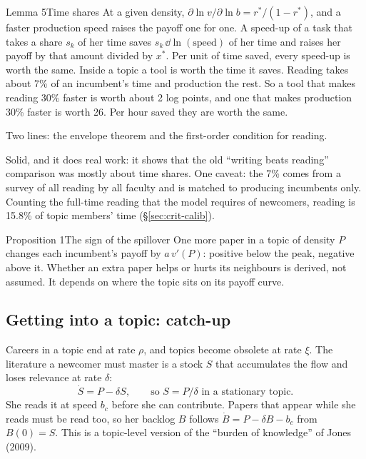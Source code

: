 \begin{resultbox}{Lemma 5}{Time shares}{\tsolid}
At a given density, $\partial\ln v/\partial\ln b=r^*/(1-r^*)$, and a faster production speed raises the payoff one for one. A speed-up of a task that takes a share $s_k$ of her time saves $s_k\,\dd\ln(\text{speed})$ of her time and raises her payoff by that amount divided by $x^*$. Per unit of time saved, every speed-up is worth the same.
\tcblower
\inwords Inside a topic a tool is worth the time it saves. Reading takes about 7\% of an incumbent's time and production the rest. So a tool that makes reading 30\% faster is worth about 2 log points, and one that makes production 30\% faster is worth 26. Per hour saved they are worth the same.

\why Two lines: the envelope theorem and the first-order condition for reading.

\review Solid, and it does real work: it shows that the old ``writing beats reading'' comparison was mostly about time shares. One caveat: the 7\% comes from a survey of all reading by all faculty and is matched to producing incumbents only. Counting the full-time reading that the model requires of newcomers, reading is 15.8\% of topic members' time (\S\ref{sec:crit-calib}).
\end{resultbox}

\begin{resultbox}{Proposition 1}{The sign of the spillover}{\tsolid}
One more paper in a topic of density $P$ changes each incumbent's payoff by $a\,v'(P)$: positive below the peak, negative above it.
\tcblower
\inwords Whether an extra paper helps or hurts its neighbours is derived, not assumed. It depends on where the topic sits on its payoff curve.
\end{resultbox}

\subsection{Getting into a topic: catch-up}\label{sec:model-catchup}

Careers in a topic end at rate $\rho$, and topics become obsolete at rate $\xi$. The literature a newcomer must master is a stock $S$ that accumulates the flow and loses relevance at rate $\delta$:
\[
\dot S=P-\delta S,\qquad\text{so } S=P/\delta \text{ in a stationary topic.}
\]
She reads it at speed $b_c$ before she can contribute. Papers that appear while she reads must be read too, so her backlog $B$ follows $\dot B=P-\delta B-b_c$ from $B(0)=S$. This is a topic-level version of the ``burden of knowledge'' of Jones (2009).

